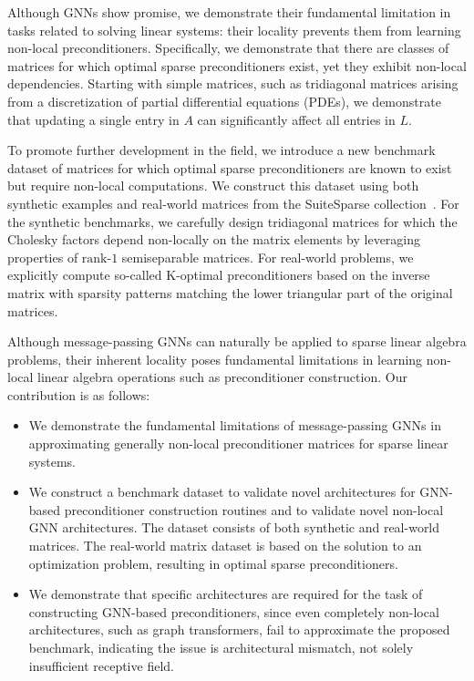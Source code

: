 \documentclass[10pt]{article} %
\theoremstyle{plain}
\theoremstyle{definition}
\theoremstyle{remark}
\begin{document}
Although GNNs show promise, we demonstrate their fundamental limitation in tasks related to solving linear systems: their locality prevents them from learning non-local preconditioners. Specifically, we demonstrate that there are classes of matrices for which optimal sparse preconditioners exist, yet they exhibit non-local dependencies. Starting with simple matrices, such as tridiagonal matrices arising from a discretization of partial differential equations (PDEs), we demonstrate that updating a single entry in $A$ can significantly affect all entries in $L$. 

To promote further development in the field, we introduce a new benchmark dataset of matrices for which optimal sparse preconditioners are known to exist but require non-local computations. We construct this dataset using both synthetic examples and real-world matrices from the SuiteSparse collection~\citep{suitesparse2024}. For the synthetic benchmarks, we carefully design tridiagonal matrices for which the Cholesky factors depend non-locally on the matrix elements by leveraging properties of $\text{rank-}1$ semiseparable matrices. For real-world problems, we explicitly compute so-called K-optimal preconditioners based on the inverse matrix with sparsity patterns matching the lower triangular part of the original matrices.

Although message-passing GNNs can naturally be applied to sparse linear algebra problems, their inherent locality poses fundamental limitations in learning non-local linear algebra operations such as preconditioner construction. Our contribution is as follows:
\begin{itemize}
    \item We demonstrate the fundamental limitations of message-passing GNNs in approximating generally non-local preconditioner matrices for sparse linear systems.
    \item We construct a benchmark dataset to validate novel architectures for GNN-based preconditioner construction routines and to validate novel non-local GNN architectures. The dataset consists of both synthetic and real-world matrices.
    The real-world matrix dataset is based on the solution to an optimization problem, resulting in optimal sparse preconditioners.
    \item We demonstrate that specific architectures are required for the task of constructing GNN-based preconditioners, since even completely non-local architectures, such as graph transformers, fail to approximate the proposed benchmark, indicating the issue is architectural mismatch, not solely insufficient receptive field.
\end{itemize}
\end{document}
